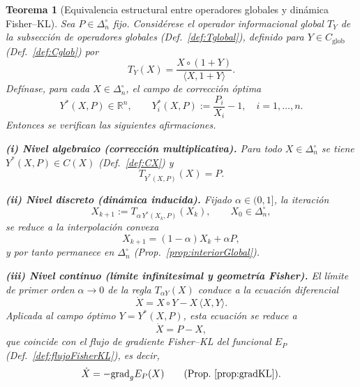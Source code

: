 \documentclass[12pt]{article}
\newtheorem{teorema}{Teorema}[section]
\begin{document}
\begin{teorema}[Equivalencia estructural entre operadores globales y dinámica Fisher--KL]
\label{teo:equivalenciaCD}
Sea $P\in\Delta_n^\circ$ fijo. Considérese el operador informacional global $T_Y$
de la subsección de operadores globales (Def.~\ref{def:Tglobal}), definido para $Y\in C_{\mathrm{glob}}$
(Def.~\ref{def:Cglob}) por
\[
T_Y(X)=\frac{X\circ(1+Y)}{\langle X,1+Y\rangle}.
\]
Defínase, para cada $X\in\Delta_n^\circ$, el campo de corrección óptima
\[
Y^*(X,P)\in\mathbb{R}^n,
\qquad
Y^*_i(X,P):=\frac{P_i}{X_i}-1,\quad i=1,\dots,n.
\]
Entonces se verifican las siguientes afirmaciones.

\smallskip
\noindent\textbf{(i) Nivel algebraico (corrección multiplicativa).}
Para todo $X\in\Delta_n^\circ$ se tiene $Y^*(X,P)\in C(X)$ (Def.~\ref{def:CX}) y
\[
T_{Y^*(X,P)}(X)=P.
\]

\smallskip
\noindent\textbf{(ii) Nivel discreto (dinámica inducida).}
Fijado $\alpha\in(0,1]$, la iteración
\[
X_{k+1}:=T_{\alpha\,Y^*(X_k,P)}(X_k),\qquad X_0\in\Delta_n^\circ,
\]
se reduce a la interpolación convexa
\[
X_{k+1}=(1-\alpha)X_k+\alpha P,
\]
y por tanto permanece en $\Delta_n^\circ$ (Prop.~\ref{prop:interiorGlobal}).

\smallskip
\noindent\textbf{(iii) Nivel continuo (límite infinitesimal y geometría Fisher).}
El límite de primer orden $\alpha\to 0$ de la regla
$T_{\alpha Y}(X)$ conduce a la ecuación diferencial
\[
\dot X = X\circ Y - X\,\langle X,Y\rangle.
\]
Aplicada al campo óptimo $Y=Y^*(X,P)$, esta ecuación se reduce a
\[
\dot X = P-X,
\]
que coincide con el flujo de gradiente Fisher--KL del funcional $E_P$
(Def.~\ref{def:flujoFisherKL}), es decir,
\[
\dot X=-\mathrm{grad}_g E_P(X)
\qquad
(\text{Prop.~\ref{prop:gradKL}}).
\]

\end{teorema}
\end{document}
